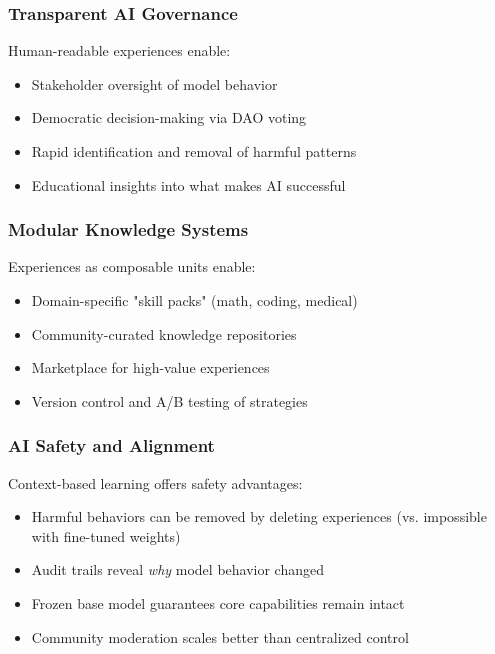 \subsubsection{Transparent AI Governance}
Human-readable experiences enable:
\begin{itemize}
    \item Stakeholder oversight of model behavior
    \item Democratic decision-making via DAO voting
    \item Rapid identification and removal of harmful patterns
    \item Educational insights into what makes AI successful
\end{itemize}

\subsubsection{Modular Knowledge Systems}
Experiences as composable units enable:
\begin{itemize}
    \item Domain-specific "skill packs" (math, coding, medical)
    \item Community-curated knowledge repositories
    \item Marketplace for high-value experiences
    \item Version control and A/B testing of strategies
\end{itemize}

\subsubsection{AI Safety and Alignment}
Context-based learning offers safety advantages:
\begin{itemize}
    \item Harmful behaviors can be removed by deleting experiences (vs. impossible with fine-tuned weights)
    \item Audit trails reveal \textit{why} model behavior changed
    \item Frozen base model guarantees core capabilities remain intact
    \item Community moderation scales better than centralized control
\end{itemize}

